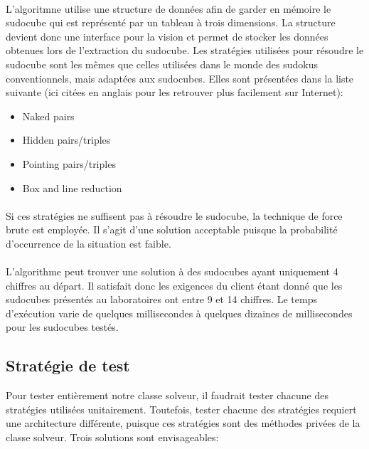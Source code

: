 \paragraph{}L'algoritmne utilise une structure de données afin de garder en mémoire le sudocube qui est représenté par un tableau à trois dimensions. La structure devient donc une interface pour la vision et permet de stocker les données obtenues lors de l'extraction du sudocube.
Les stratégies utilisées pour résoudre le sudocube sont les mêmes que celles  utilisées dans le monde des sudokus conventionnels, mais adaptées aux sudocubes. Elles sont présentées dans la liste suivante (ici citées en anglais pour les retrouver plus facilement sur Internet):\newline
\begin{itemize}
\item Naked pairs
\item Hidden pairs/triples
\item Pointing pairs/triples
\item Box and line reduction
\end{itemize}
\paragraph{}Si ces stratégies ne suffisent pas à résoudre le sudocube, la technique de force brute est employée. Il s'agit d'une solution acceptable puisque la probabilité d’occurrence de la situation est faible.

\paragraph{}L'algorithme peut trouver une solution à des sudocubes ayant uniquement 4 chiffres au départ. Il satisfait donc les exigences du client étant donné que les sudocubes présentés au laboratoires ont entre 9 et 14 chiffres. Le temps d'exécution varie de quelques millisecondes à quelques dizaines de millisecondes pour les sudocubes testés.

\subsection{Stratégie de test}
Pour tester entièrement notre classe solveur, il faudrait tester chacune des stratégies utilisées unitairement. Toutefois, tester chacune des stratégies requiert une architecture différente, puisque ces stratégies sont des méthodes privées de la classe solveur. Trois solutions sont envisageables:

